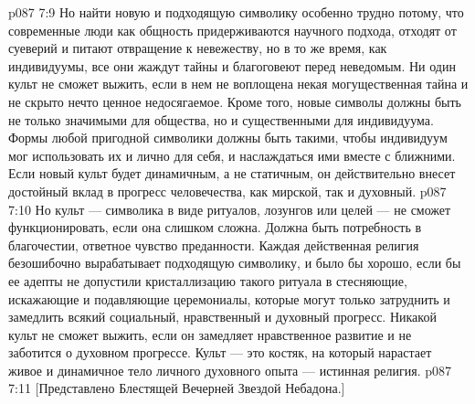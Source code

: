 \vs p087 7:9 Но найти новую и подходящую символику особенно трудно потому, что современные люди как общность придерживаются научного подхода, отходят от суеверий и питают отвращение к невежеству, но в то же время, как индивидуумы, все они жаждут тайны и благоговеют перед неведомым. Ни один культ не сможет выжить, если в нем не воплощена некая могущественная тайна и не скрыто нечто ценное недосягаемое. Кроме того, новые символы должны быть не только значимыми для общества, но и существенными для индивидуума. Формы любой пригодной символики должны быть такими, чтобы индивидуум мог использовать их и лично для себя, и наслаждаться ими вместе с ближними. Если новый культ будет динамичным, а не статичным, он действительно внесет достойный вклад в прогресс человечества, как мирской, так и духовный.
\vs p087 7:10 Но культ --- символика в виде ритуалов, лозунгов или целей --- не сможет функционировать, если она слишком сложна. Должна быть потребность в благочестии, ответное чувство преданности. Каждая действенная религия безошибочно вырабатывает подходящую символику, и было бы хорошо, если бы ее адепты не допустили кристаллизацию такого ритуала в стесняющие, искажающие и подавляющие церемониалы, которые могут только затруднить и замедлить всякий социальный, нравственный и духовный прогресс. Никакой культ не сможет выжить, если он замедляет нравственное развитие и не заботится о духовном прогрессе. Культ --- это костяк, на который нарастает живое и динамичное тело личного духовного опыта --- истинная религия.
\vsetoff
\vs p087 7:11 [Представлено Блестящей Вечерней Звездой Небадона.]
